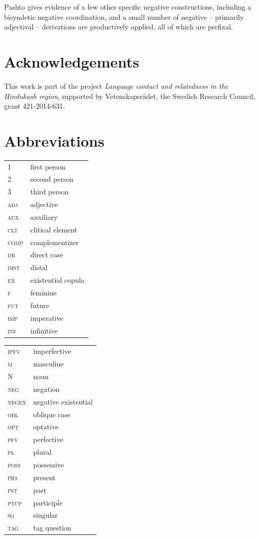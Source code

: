 \documentclass[output=paper,colorlinks,citecolor=brown]{langscibook}
\begin{document}
Pashto gives evidence of a few other specific negative constructions, including a bisyndetic negative coordination, and a small number of negative – primarily adjectival – derivations are productively applied, all of which are prefixal.

\section*{Acknowledgements}

This work is part of the project \textit{Language contact and relatedness in the Hindukush region}, supported by Vetenskapsrådet, the Swedish Research Council, grant 421-2014-631.

\section*{Abbreviations}

\begin{tabularx}{.45\textwidth}{lQ}
{\scshape 1} & first person\\
{\scshape 2} & second person\\
{\scshape 3} & third person\\
\textsc{adj} & adjective \\
{\scshape aux} & auxiliary \\
{\scshape clt} & clitical element \\
{\scshape comp} & complementizer \\
{\scshape dr} & direct case \\
{\scshape dist} & distal \\
{\scshape ex} & existential copula \\
{\scshape f} & feminine \\
{\scshape fut} & future \\
{\scshape imp} & imperative \\
{\scshape inf} & infinitive \\
\end{tabularx}
\begin{tabularx}{.45\textwidth}{lQ}
{\scshape ipfv} & imperfective \\
{\scshape m} & masculine \\
N & noun \\
\textsc{neg} & negation\\
\textsc{negex} & negative existential \\
{\scshape obl} & oblique case\\
{\scshape opt} & optative\\
{\scshape pfv} & perfective\\
{\scshape pl} & plural\\
{\scshape poss} & possessive\\
{\scshape prs} & present\\
{\scshape pst} & past\\
{\scshape ptcp} & participle\\
{\scshape sg} & singular\\
{\scshape tag} & tag question\\
\end{tabularx}

\sloppy\printbibliography[heading=subbibliography,notkeyword=this]
\end{document}

